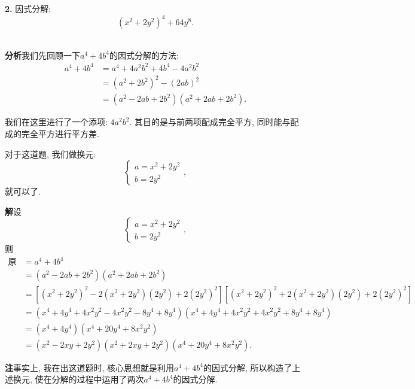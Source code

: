 \documentclass{article}
\begin{document}
\textbf{2. }{\kaishu 因式分解:
\[\left(x^2+2y^2\right)^4+64y^8.\]
}\\\par
\textbf{分析}\quad 我们先回顾一下$a^4+4b^4$的因式分解的方法:
\begin{align*}
	a^4+4b^4&=a^4+4a^2b^2+4b^4-4a^2b^2\\
	&=\left(a^2+2b^2\right)^2-(2ab)^2\\
	&=\left(a^2-2ab+2b^2\right)\left(a^2+2ab+2b^2\right).
\end{align*}\par
我们在这里进行了一个添项: $4a^2b^2$. 其目的是与前两项配成完全平方, 同时能与配成的完全平方进行平方差.\par
对于这道题, 我们做换元:
\[\begin{cases}
	a=x^2+2y^2\\b=2y^2
\end{cases}, \]
就可以了.\\\par
\textbf{解}\quad 设
\[\begin{cases}
	a=x^2+2y^2\\b=2y^2
\end{cases}, \]
则\begin{align*}
	\text{原式}&=a^4+4b^4\\
	&=\left(a^2-2ab+2b^2\right)\left(a^2+2ab+2b^2\right)\\
	&=\left[\left(x^2+2y^2\right)^2-2\left(x^2+2y^2\right)\left(2y^2\right)+2\left(2y^2\right)^2\right]\left[\left(x^2+2y^2\right)^2+2\left(x^2+2y^2\right)\left(2y^2\right)+2\left(2y^2\right)^2\right]\\
	&=\left(x^4+4y^4+4x^2y^2-4x^2y^2-8y^4+8y^4\right)\left(x^4+4y^4+4x^2y^2+4x^2y^2+8y^4+8y^4\right)\\
	&=\left(x^4+4y^4\right)\left(x^4+20y^4+8x^2y^2\right)\\
	&=\left(x^2-2xy+2y^2\right)\left(x^2+2xy+2y^2\right)\left(x^4+20y^4+8x^2y^2\right).
\end{align*}\par
\textbf{注}\quad 事实上, 我在出这道题时, 核心思想就是利用$a^4+4b^4$的因式分解, 所以构造了上述换元, 使在分解的过程中运用了两次$a^4+4b^4$的因式分解.
\end{document}
